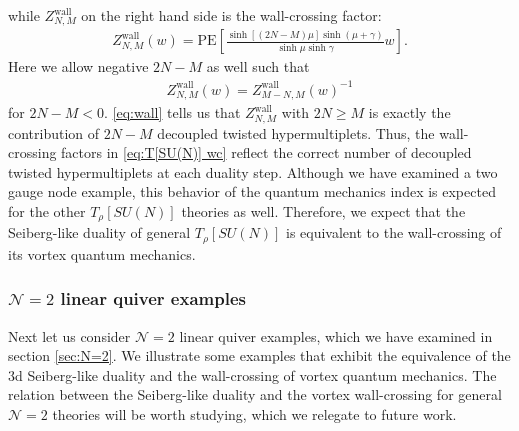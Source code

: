 \documentclass[a4paper,11pt]{article}
\begin{document}
while $Z^\text{wall}_{N,M}$ on the right hand side is the wall-crossing factor:
\begin{align}
Z^\text{wall}_{N,M} (w) = \mathrm{PE} \left[\frac{\sinh \left[(2 N-M) \mu\right] \sinh (\mu+\gamma)}{\sinh \mu \sinh \gamma} w\right].
\end{align}
Here we allow negative $2 N-M$ as well such that
\begin{align}
Z^\text{wall}_{N,M} (w) = Z^\text{wall}_{M-N,M} (w)^{-1}
\end{align}
for $2 N-M < 0$. \eqref{eq:wall} tells us that $Z^\text{wall}_{N,M}$ with $2 N \geq M$ is exactly the contribution of $2 N-M$ decoupled twisted hypermultiplets. Thus, the wall-crossing factors in \eqref{eq:T[SU(N)] wc} reflect the correct number of decoupled twisted hypermultiplets at each duality step. Although we have examined a two gauge node example, this behavior of the quantum mechanics index is expected for the other $T_\rho [SU(N)]$ theories as well. Therefore, we expect that the Seiberg-like duality of general $T_\rho [SU(N)]$ is equivalent to the wall-crossing of its vortex quantum mechanics.
\\



\subsubsection{$\mathcal N = 2$ linear quiver examples}

Next let us consider $\mathcal N = 2$ linear quiver examples, which we have examined in section \ref{sec:N=2}. We illustrate some examples that exhibit the equivalence of the 3d Seiberg-like duality and the wall-crossing of vortex quantum mechanics. The relation between the Seiberg-like duality and the vortex wall-crossing for general $\mathcal N = 2$ theories will be worth studying, which we relegate to future work.
\end{document}
